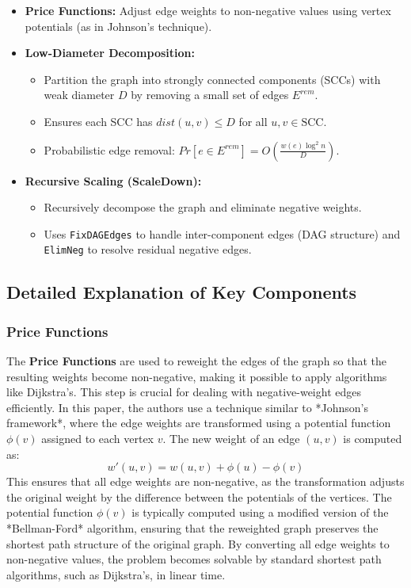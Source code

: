 \documentclass{article}
\begin{document}
\begin{itemize}
    \item \textbf{Price Functions:} Adjust edge weights to non-negative values using vertex potentials (as in Johnson's technique).
    \item \textbf{Low-Diameter Decomposition:} 
        \begin{itemize}
            \item Partition the graph into strongly connected components (SCCs) with weak diameter \( D \) by removing a small set of edges \( E^{rem} \).
            \item Ensures each SCC has \( dist(u, v) \leq D \) for all \( u, v \in \text{SCC} \).
            \item Probabilistic edge removal: \( Pr[e \in E^{rem}] = O \left( \frac{w(e) \log^2 n}{D} \right) \).
        \end{itemize}
    \item \textbf{Recursive Scaling (ScaleDown):} 
        \begin{itemize}
            \item Recursively decompose the graph and eliminate negative weights.
            \item Uses \texttt{FixDAGEdges} to handle inter-component edges (DAG structure) and \texttt{ElimNeg} to resolve residual negative edges.
        \end{itemize}
\end{itemize}

\subsection{Detailed Explanation of Key Components}

\subsubsection{Price Functions}
The \textbf{Price Functions} are used to reweight the edges of the graph so that the resulting weights become non-negative, making it possible to apply algorithms like Dijkstra's. This step is crucial for dealing with negative-weight edges efficiently. In this paper, the authors use a technique similar to *Johnson's framework*, where the edge weights are transformed using a potential function \( \phi(v) \) assigned to each vertex \( v \). The new weight of an edge \( (u, v) \) is computed as:
\[
w'(u, v) = w(u, v) + \phi(u) - \phi(v)
\]
This ensures that all edge weights are non-negative, as the transformation adjusts the original weight by the difference between the potentials of the vertices. The potential function \( \phi(v) \) is typically computed using a modified version of the *Bellman-Ford* algorithm, ensuring that the reweighted graph preserves the shortest path structure of the original graph. By converting all edge weights to non-negative values, the problem becomes solvable by standard shortest path algorithms, such as Dijkstra's, in linear time.
\end{document}
